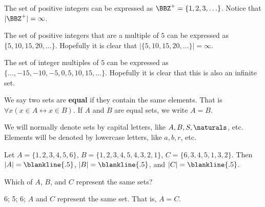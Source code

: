 \begin{exa}
The set of positive integers can be expressed as $\BBZ^+=\{1, 2, 3, \ldots\}$. 
Notice that $|\BBZ^+|=\infty$.

The set of positive integers that are a multiple of $5$ can be expressed as $\{5, 10, 15, 20, \ldots\}$.
Hopefully it is clear that $|\{5, 10, 15, 20, \ldots\}|=\infty$.

The set of integer multiples of $5$ can be expressed as 
$\{\ldots, -15, -10, -5, 0, 5, 10, 15, \ldots\}.$
Hopefully it is clear that this is also an infinite set.
\end{exa}


\begin{df}
We say two sets are {\bf equal} if they contain the same elements.
That is $\forall x(x\in A \leftrightarrow x\in B)$.
If $A$ and $B$ are equal sets, we write $A=B$. %
\end{df}

\begin{rem} We will normally denote sets by capital letters, like  $A, B, S ,\naturals$, etc. 
Elements will be denoted by lowercase letters, like $a, b, r$, etc.
\end{rem}

\begin{exer}
Let $A=\{1,2,3,4,5,6\}$, $B=\{1,2,3,4,5,4,3,2,1\}$,  
$C=\{6,3,4,5,1,3,2\}$.
Then $|A|=\blankline{.5}$, $|B|=\blankline{.5}$, and $|C|=\blankline{.5}$.

Which of $A$, $B$, and $C$ represent the same sets? \blanklinefill
\begin{answer}
6; 5; 6; $A$ and $C$ represent the same set. That is, $A=C$.
\end{answer}
\end{exer}


